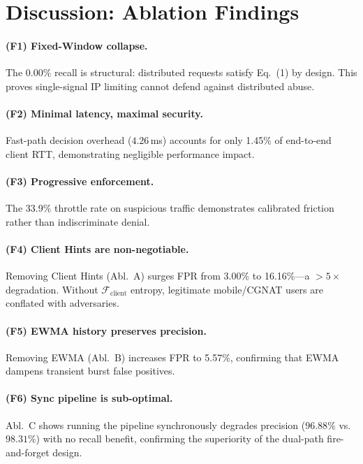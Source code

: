 \documentclass[journal,10pt]{IEEEtran}
\newcommand{\Fclient}{\mathcal{F}_{\mathrm{client}}}
\begin{document}
\begin{table}[!t]
\section{Discussion: Ablation Findings}
\label{sec:ablation}

\paragraph{(F1) Fixed-Window collapse.} The 0.00\% recall is structural: distributed requests satisfy Eq.~(1) by design. This proves single-signal IP limiting cannot defend against distributed abuse.

\paragraph{(F2) Minimal latency, maximal security.} Fast-path decision overhead ($4.26$\,ms) accounts for only 1.45\% of end-to-end client RTT, demonstrating negligible performance impact.

\paragraph{(F3) Progressive enforcement.} The 33.9\% throttle rate on suspicious traffic demonstrates calibrated friction rather than indiscriminate denial.

\paragraph{(F4) Client Hints are non-negotiable.} Removing Client Hints (Abl.\ A) surges FPR from 3.00\% to 16.16\%---a $>5\times$ degradation. Without $\Fclient$ entropy, legitimate mobile/CGNAT users are conflated with adversaries.

\paragraph{(F5) EWMA history preserves precision.} Removing EWMA (Abl.\ B) increases FPR to 5.57\%, confirming that EWMA dampens transient burst false positives.

\paragraph{(F6) Sync pipeline is sub-optimal.} Abl.\ C shows running the pipeline synchronously degrades precision ($96.88\%$ vs.\ $98.31\%$) with no recall benefit, confirming the superiority of the dual-path fire-and-forget design.


\end{table}
\end{document}
